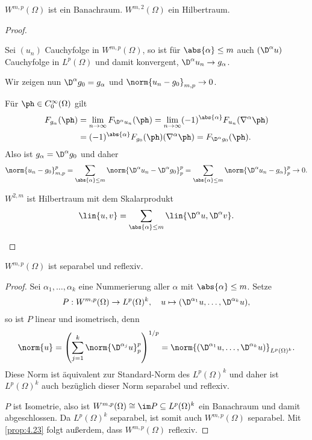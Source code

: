 \begin{prop}
\label{prop:7.29}
$W^{m,p}(\Omega)$ ist ein Banachraum. $W^{m,2}(\Omega)$ ein
Hilbertraum.\fishhere
\end{prop}
\begin{proof}
\begin{proofenum}
\item Sei $(u_n)$ Cauchyfolge in $W^{m,p}(\Omega)$, so ist für $\abs{\alpha}\le
m$ auch $(\D^\alpha u)$ Cauchyfolge in $L^p(\Omega)$ und damit konvergent,
$\D^\alpha u_n \to g_\alpha$.

Wir zeigen nun $\D^\alpha g_0 = g_\alpha$ und $\norm{u_n-g_0}_{m,p} \to 0$.

Für $\ph\in C_0^\infty(\Omega)$ gilt
\begin{align*}
F_{g_\alpha}(\ph) &= \lim\limits_{n\to\infty} F_{\D^\alpha u_n}(\ph)
= \lim\limits_{n\to\infty}(-1)^{\abs{\alpha}}F_{u_n}(\nabla^\alpha \ph)\\
&= (-1)^{\abs{\alpha}} F_{g_0}(\ph)(\nabla^\alpha \ph) = F_{\D^\alpha g_0}(\ph).
\end{align*}
Also ist $g_\alpha = \D^\alpha g_0$ und daher
\begin{align*}
\norm{u_n-g_0}_{m,p}^p
= \sum_{\abs{\alpha}\le m}\norm{\D^\alpha u_n - \D^\alpha g_0}_{p}^p
=
\sum_{\abs{\alpha}\le m}\norm{\D^\alpha u_n - g_\alpha}_{p}^p
\to 0.
\end{align*}
\item $W^{2,m}$ ist Hilbertraum mit dem Skalarprodukt
\begin{align*}
\lin{u,v} = \sum_{\abs{\alpha}\le m} \lin{\D^\alpha u,\D^\alpha v}.\qedhere
\end{align*}
\end{proofenum}

\end{proof}

\begin{prop}
\label{prop:7.30}
$W^{m,p}(\Omega)$ ist separabel und reflexiv.\fishhere
\end{prop}
\begin{proof}
Sei $\alpha_1,\ldots,\alpha_k$ eine Nummerierung aller $\alpha$ mit
$\abs{\alpha}\le m$. Setze
\begin{align*}
P : W^{m,p}(\Omega)\to L^p(\Omega)^k,\quad
u\mapsto (\D^{\alpha_1}u,\ldots,\D^{\alpha_k}u),  
\end{align*}
so ist $P$ linear und isometrisch, denn
\begin{align*}
\norm{u} = 
\left(\sum_{j=1}^k \norm{\D^{\alpha_j}u}_p^p \right)^{1/p}
 = \norm{(\D^{\alpha_1}u,\ldots,\D^{\alpha_k}u)}_{L^p(\Omega)^k}.
\end{align*}
Diese Norm ist äquivalent zur Standard-Norm des $L^p(\Omega)^k$ und daher ist
$L^p(\Omega)^k$ auch bezüglich dieser Norm separabel und reflexiv.

$P$ ist Isometrie, also ist $W^{m,p}(\Omega)\cong \im P \subseteq L^p(\Omega)^k$
ein Banachraum und damit abgeschlossen. Da $L^p(\Omega)^k$ separabel, ist
somit auch $W^{m,p}(\Omega)$ separabel. Mit \ref{prop:4.23} folgt außerdem, dass
$W^{m,p}(\Omega)$ reflexiv.\qedhere
\end{proof}

